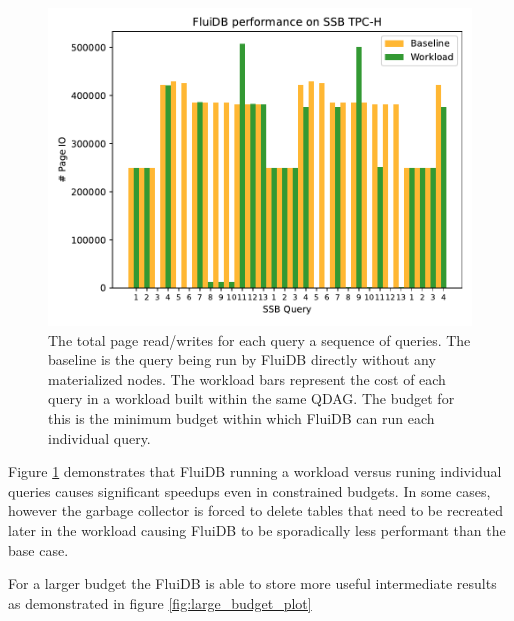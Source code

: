 \begin{figure}[p]
\centering
\includegraphics[width=.9\linewidth]{./plans/io_perf_23000.pdf}
\caption{\label{fig:min_budget_plot}
  The total page read/writes for each query a sequence of queries. The
  baseline is the query being run by FluiDB directly without any
  materialized nodes. The workload bars represent the cost of each
  query in a workload built within the same QDAG. The budget for this
  is the minimum budget within which FluiDB can run each individual
  query.}
\end{figure}

Figure \ref{fig:min_budget_plot} demonstrates that FluiDB running a
workload versus runing individual queries causes significant speedups
even in constrained budgets. In some cases, however the garbage
collector is forced to delete tables that need to be recreated later
in the workload causing FluiDB to be sporadically less performant than
the base case.

For a larger budget the FluiDB is able to store more useful
intermediate results as demonstrated in figure \ref{fig:large_budget_plot}

